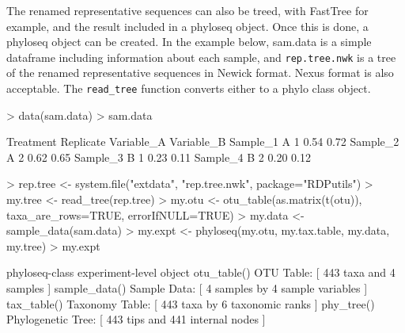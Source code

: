 \documentclass{article}
\begin{document}
The renamed representative sequences can also be treed, with FastTree for example, and the result included in a phyloseq object.  Once this is done, a phyloseq object can be created.  In the example below, sam.data is a simple dataframe including information about each sample, and \texttt{rep.tree.nwk} is a tree of the renamed representative sequences in Newick format.  Nexus format is also acceptable.  The \texttt{read\_tree} function converts either to a phylo class object.
\begin{Schunk}
\begin{Sinput}
> data(sam.data)
> sam.data
\end{Sinput}
\begin{Soutput}
         Treatment Replicate Variable_A Variable_B
Sample_1         A         1       0.54       0.72
Sample_2         A         2       0.62       0.65
Sample_3         B         1       0.23       0.11
Sample_4         B         2       0.20       0.12
\end{Soutput}
\begin{Sinput}
> rep.tree <- system.file("extdata", "rep.tree.nwk", package="RDPutils")
> my.tree <- read_tree(rep.tree)
> my.otu <- otu_table(as.matrix(t(otu)), taxa_are_rows=TRUE, errorIfNULL=TRUE)
> my.data <- sample_data(sam.data)
> my.expt <- phyloseq(my.otu, my.tax.table, my.data, my.tree)
> my.expt
\end{Sinput}
\begin{Soutput}
phyloseq-class experiment-level object
otu_table()   OTU Table:         [ 443 taxa and 4 samples ]
sample_data() Sample Data:       [ 4 samples by 4 sample variables ]
tax_table()   Taxonomy Table:    [ 443 taxa by 6 taxonomic ranks ]
phy_tree()    Phylogenetic Tree: [ 443 tips and 441 internal nodes ]
\end{Soutput}
\end{Schunk}
\end{document}
